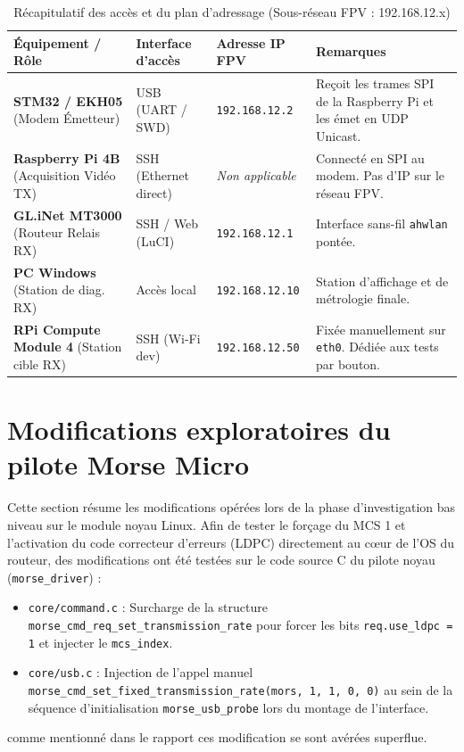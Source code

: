 \documentclass[a4paper,12pt]{article}
\begin{document}
\begin{table}[htbp]
    \centering
    \renewcommand{\arraystretch}{1.4}
    \begin{tabular}{|p{4.5cm}|p{3.5cm}|p{3cm}|p{4.5cm}|}
        \hline
        \textbf{Équipement / Rôle} & \textbf{Interface d'accès} & \textbf{Adresse IP FPV} & \textbf{Remarques} \\
        \hline
        \hline
        \textbf{STM32 / EKH05} \newline (Modem Émetteur) & USB (UART / SWD) & \texttt{192.168.12.2} & Reçoit les trames SPI de la Raspberry Pi et les émet en UDP Unicast. \\
        \hline
        \textbf{Raspberry Pi 4B} \newline (Acquisition Vidéo TX) & SSH (Ethernet direct) & \textit{Non applicable} & Connecté en SPI au modem. Pas d'IP sur le réseau FPV. \\
        \hline
        \textbf{GL.iNet MT3000} \newline (Routeur Relais RX) & SSH / Web (LuCI) & \texttt{192.168.12.1} & Interface sans-fil \texttt{ahwlan} pontée. \\
        \hline
        \textbf{PC Windows} \newline (Station de diag. RX) & Accès local & \texttt{192.168.12.10} & Station d'affichage et de métrologie finale. \\
        \hline
        \textbf{RPi Compute Module 4} \newline (Station cible RX) & SSH (Wi-Fi dev) & \texttt{192.168.12.50} & Fixée manuellement sur \texttt{eth0}. Dédiée aux tests par bouton. \\
        \hline
    \end{tabular}
    \caption{Récapitulatif des accès et du plan d'adressage (Sous-réseau FPV : 192.168.12.x)}
    \label{tab:recap_ip}
\end{table}
\newpage

\section{Modifications exploratoires du pilote Morse Micro}
\label{annexe:patch_driver}
Cette section résume les modifications opérées lors de la phase d'investigation bas niveau sur le module noyau Linux.
Afin de tester le forçage du MCS 1 et l'activation du code correcteur d'erreurs (LDPC) directement au cœur de l'OS du routeur, des modifications ont été testées sur le code source C du pilote noyau 
(\texttt{morse\_driver}) :
\begin{itemize}
    \item \texttt{core/command.c} : Surcharge de la structure \texttt{morse\_cmd\_req\_set\_transmission\_rate} pour forcer les bits \texttt{req.use\_ldpc = 1} et injecter le \texttt{mcs\_index}.
    \item \texttt{core/usb.c} : Injection de l'appel manuel \texttt{morse\_cmd\_set\_fixed\_transmission\_rate(mors, 1, 1, 0, 0)} au sein de la séquence d'initialisation \texttt{morse\_usb\_probe} lors du montage de l'interface.
\end{itemize}
comme mentionné dans le rapport ces modification se sont avérées superflue.
\end{document}
